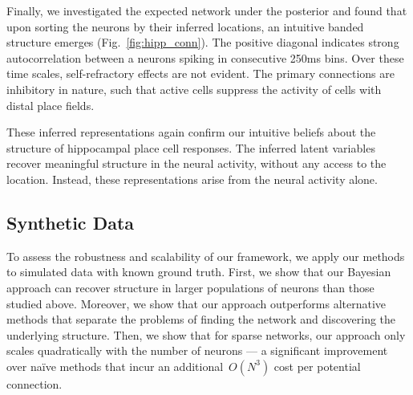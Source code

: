 Finally, we investigated the expected network under the posterior and 
found that upon sorting the neurons by their inferred locations, an
intuitive banded structure emerges (Fig.~\ref{fig:hipp_conn}). 
The positive diagonal indicates strong autocorrelation between a 
neurons spiking in consecutive 250ms bins. Over these time scales, 
self-refractory effects are not evident. The primary connections 
are inhibitory in nature, such that active cells suppress the activity 
of cells with distal place fields. 

These inferred representations again confirm our intuitive beliefs 
about the structure of hippocampal place cell responses. The 
inferred latent variables recover meaningful structure in the
neural activity, without any access to the location. Instead, 
these representations arise from the neural activity alone.

\subsection{Synthetic Data}
\label{sec:synthetic}

To assess the robustness and scalability of our framework, we apply
our methods to simulated data with known ground truth.  First, we show
that our Bayesian approach can recover structure in larger populations
of neurons than those studied above.  Moreover, we show that our
approach outperforms alternative methods that separate the problems of
finding the network and discovering the underlying structure. Then, we
show that for sparse networks, our approach only scales quadratically
with the number of neurons --- a significant improvement over na\"ive
methods that incur an additional~$O(N^3)$ cost per potential connection.


